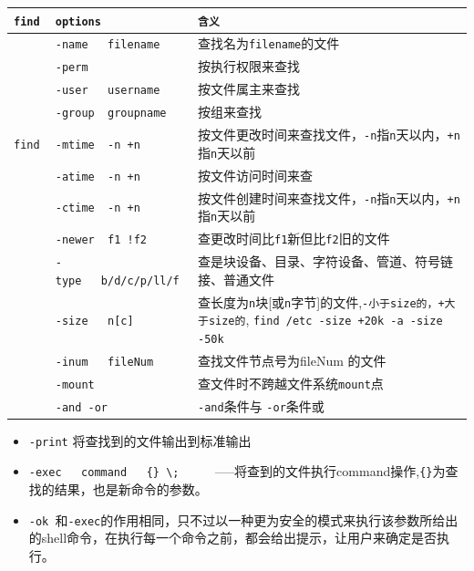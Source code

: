 \documentclass[UTF8,a4paper,12pt]{ctexbook}
\begin{document}
			\begin{table}[H]
				\centering
				\begin{tabular}{l|m{7cm}|m{8cm}}
					\hline
					\verb|find |   	   & \verb|options| & \verb|含义|\\
					\hline
					\verb| |   	   & \verb|-name   filename |& 	查找名为\verb|filename|的文件	\\
					\verb| |   	   & \verb|-perm | & 			按执行权限来查找	\\
					\verb| |   	   & \verb|-user   username | & 按文件属主来查找					\\
					\verb| |   	   & \verb|-group  groupname | &按组来查找 					\\
					\verb|find |   	   & \verb|-mtime  -n +n | & 	按文件更改时间来查找文件，\verb|-n|指\verb|n|天以内，\verb|+n|指\verb|n|天以前				\\
					\verb| |   	   & \verb|-atime  -n +n | &	按文件访问时间来查				\\
					\verb| |   	   & \verb|-ctime  -n +n | & 	按文件创建时间来查找文件，\verb|-n|指\verb|n|天以内，\verb|+n|指\verb|n|天以前				\\
					\verb| |   	   & \verb|-newer  f1 !f2| & 	查更改时间比\verb|f1|新但比\verb|f2|旧的文件				\\
					\verb| |   	   & \verb|-type   b/d/c/p/ll/f |&查是块设备、目录、字符设备、管道、符号链接、普通文件 		\\
					\verb| |   	   & \verb|-size   n[c] | & 	查长度为\verb|n|块[或\verb|n|字节]的文件,\verb|-小于size的，+大于size的|, \verb|find /etc -size +20k -a -size -50k|	\\
					\verb| |	   & \verb|-inum   fileNum|			&   查找文件节点号为fileNum 的文件\\
					\verb| |   	   & \verb|-mount | & 			查文件时不跨越文件系统\verb|mount|点		\\
					\verb| |	   & \verb|-and -or| & \verb|-and|条件与 \verb|-or|条件或\\
					\hline
				\end{tabular}
			\end{table}	
			
			\begin{itemize}
				\item  \verb|-print| 将查找到的文件输出到标准输出
				\item  \verb|-exec   command   {} \;|      —–将查到的文件执行command操作,\verb|{}|为查找的结果，也是新命令的参数。
				\item  \verb|-ok |和\verb|-exec|的作用相同，只不过以一种更为安全的模式来执行该参数所给出的shell命令，在执行每一个命令之前，都会给出提示，让用户来确定是否执行。
			\end{itemize}
			
\end{document}
